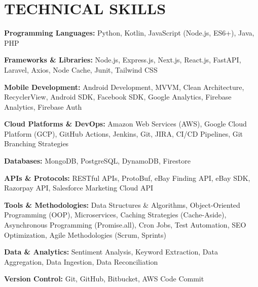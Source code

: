 \documentclass[letterpaper,11pt]{article}
\begin{document}
\section{\color{airforceblue}TECHNICAL SKILLS}
 \begin{itemize}[leftmargin=0in, label={}]
    \small{\item{
     \textbf{\normalsize{Programming Languages:}}{ \normalsize{Python, Kotlin, JavaScript (Node.js, ES6+), Java, PHP}} \\
      \vspace{1.2pt}
      
     \textbf{\normalsize{Frameworks \& Libraries:}}{ \normalsize{Node.js, Express.js, Next.js, React.js, FastAPI, Laravel, Axios, Node Cache, Junit, Tailwind CSS}} \\
      \vspace{1.2pt}
      
     \textbf{\normalsize{Mobile Development:}}{ \normalsize{Android Development, MVVM, Clean Architecture, RecyclerView, Android SDK, Facebook SDK, Google Analytics, Firebase Analytics, Firebase Auth}} \\
      \vspace{1.2pt}
      
     \textbf{\normalsize{Cloud Platforms \& DevOps:}}{ \normalsize{Amazon Web Services (AWS), Google Cloud Platform (GCP), GitHub Actions, Jenkins, Git, JIRA, CI/CD Pipelines, Git Branching Strategies}} \\
      \vspace{1.2pt}
      
     \textbf{\normalsize{Databases:}}{ \normalsize{MongoDB, PostgreSQL, DynamoDB, Firestore}} \\
      \vspace{1.2pt}
      
     \textbf{\normalsize{APIs \& Protocols:}}{ \normalsize{RESTful APIs, ProtoBuf, eBay Finding API, eBay SDK, Razorpay API, Salesforce Marketing Cloud API}} \\
      \vspace{1.2pt}
      
     \textbf{\normalsize{Tools \& Methodologies:}}{ \normalsize{Data Structures \& Algorithms, Object-Oriented Programming (OOP), Microservices, Caching Strategies (Cache-Aside), Asynchronous Programming (Promise.all), Cron Jobs, Test Automation, SEO Optimization, Agile Methodologies (Scrum, Sprints)}} \\
      \vspace{1.2pt}
      
     \textbf{\normalsize{Data \& Analytics:}}{ \normalsize{Sentiment Analysis, Keyword Extraction, Data Aggregation, Data Ingestion, Data Reconciliation}} \\
      \vspace{1.2pt}
      
     \textbf{\normalsize{Version Control:}}{ \normalsize{Git, GitHub, Bitbucket, AWS Code Commit}}
     }}
 \end{itemize}
 \vspace{-10pt}
 
\end{document}
